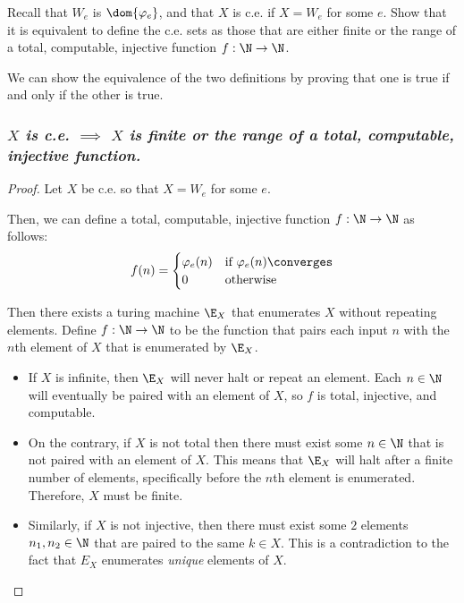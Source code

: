 \begin{problem}
  Recall that $W_e$ is $\dom{\varphi_e}$, and that $X$ is c.e. if
  $X = W_e$ for some $e$. Show that it is equivalent to define
  the c.e. sets as those that are either finite or the range
  of a total, computable, injective function
  $f : \N \to \N$.

  \begin{answer}
    We can show the equivalence of the two definitions by proving that
    one is true if and only if the other is true.
    \subsubsection*{\emph{
        $X$ is c.e. $\implies$ $X$ is finite or the range of a
        total, computable, injective function.
      }
    }

      \begin{proof}
        Let $X$ be c.e. so that $X = W_e$ for some $e$.

        Then, we can define a total, computable, injective function
        $f : \N \to \N$ as follows:
        \[
          f(n) = \begin{cases}
            \varphi_e(n) & \text{if $\varphi_e(n) \converges$} \\
            0 & \text{otherwise}
          \end{cases}
        \]

        Then there exists a turing machine $\E_X$ that enumerates $X$ without repeating elements.
        Define $f : \N \to \N$ to be the function that pairs each input $n$ with
        the $n$th element of $X$ that is enumerated by $\E_X$.

        \begin{itemize}
          \item If $X$ is infinite, then $\E_X$ will never halt or repeat an element.
            Each $n \in \N$ will eventually be paired with an element of $X$,
            so $f$ is total, injective, and computable.
          \item On the contrary, if $X$ is not total then there must
            exist some $n \in \N$ that is not paired with an element of $X$.
            This means that $\E_X$ will halt after a finite number of elements,
            specifically before the $n$th element is enumerated.
            Therefore, $X$ must be finite.
          \item Similarly, if $X$ is not injective, then there must exist
            some $2$ elements $n_1, n_2 \in \N$ that are paired to the same
            $k \in X$. This is a contradiction to the fact that
            $E_X$ enumerates \emph{unique} elements of $X$.
        \end{itemize}
      \end{proof}


\end{answer}
\end{problem}
